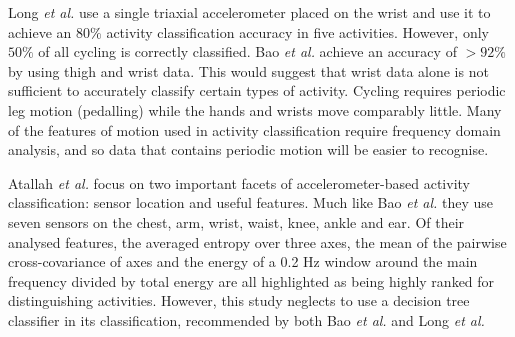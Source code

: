     Long \emph{et al.} \cite{long2009single} use a single triaxial accelerometer placed on the wrist and use it to achieve an $80\%$ activity classification accuracy in five activities. However, only $50\%$ of all cycling is correctly classified. Bao \emph{et al.} achieve an accuracy of $>92\%$ by using thigh and wrist data. This would suggest that wrist data alone is not sufficient to accurately classify certain types of activity. Cycling requires periodic leg motion (pedalling) while the hands and wrists move comparably little. Many of the features of motion used in activity classification require frequency domain analysis, and so data that contains periodic motion will be easier to recognise.
    
    Atallah \emph{et al.} \cite{atallah2010sensor} focus on two important facets of accelerometer-based activity classification: sensor location and useful features. Much like Bao \emph{et al.} they use seven sensors on the chest, arm, wrist, waist, knee, ankle and ear. Of their analysed features, the averaged entropy over three axes, the mean of the pairwise cross-covariance of axes and the energy of a 0.2 Hz window around the main frequency divided by total energy are all highlighted as being highly ranked for distinguishing activities. However, this study neglects to use a decision tree classifier in its classification, recommended by both Bao \emph{et al.} and Long \emph{et al.}

